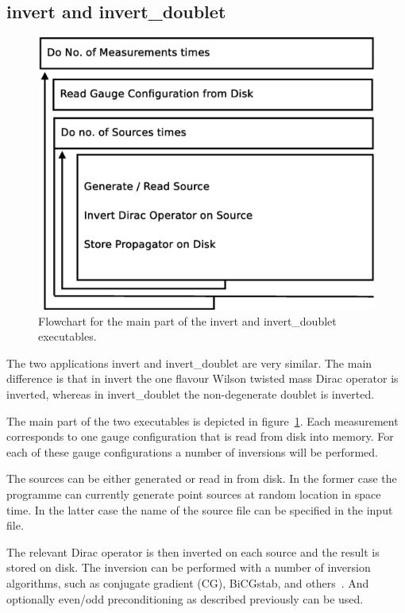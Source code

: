 \subsection{{\ttfamily invert} and {\ttfamily invert\_doublet}}

\begin{figure}[t]
  \centering
  \includegraphics[width=0.7\linewidth]{invertflow.eps}
  \caption{Flowchart for the main part of the {\ttfamily invert} and
    {\ttfamily invert\_doublet} executables.}
  \label{fig:invertflow}
\end{figure}

The two applications {\ttfamily invert} and {\ttfamily
  invert\_doublet} are very similar. The main difference is that in
{\ttfamily invert} the one flavour Wilson twisted mass Dirac operator
is inverted, whereas in {\ttfamily invert\_doublet} the non-degenerate
doublet is inverted. 

The main part of the two executables is depicted in
figure~\ref{fig:invertflow}. Each measurement corresponds to one gauge
configuration that is read from disk into memory. For each of these
gauge configurations a number of inversions will be performed. 

The sources can be either generated or read in from disk. In
the former case the programme can currently generate point sources at
random location in space time. In the latter case the name of the
source file can be specified in the input file. 

The relevant Dirac operator is then inverted on each source and the
result is stored on disk. The inversion can be performed with a number
of inversion algorithms, such as conjugate gradient (CG), BiCGstab,
and others~\cite{saad:2003a}. And optionally even/odd preconditioning
as described previously can be used. 

